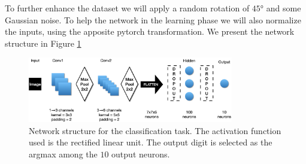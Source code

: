 To further enhance the dataset we will apply a random rotation of $45°$ and some Gaussian noise. To help the network in the learning
phase we will also normalize the inputs, using the apposite pytorch transformation. We present the network structure in Figure \ref{fig:cl_net}
\begin{figure}[h]
    \centering
    \includegraphics[width=0.8\textwidth]{Images/clas_net.png}
    \caption{Network structure for the classification task. The activation function used is the rectified linear unit.
    The output digit is selected as the argmax among the $10$ output neurons.}
    \label{fig:cl_net}
\end{figure}